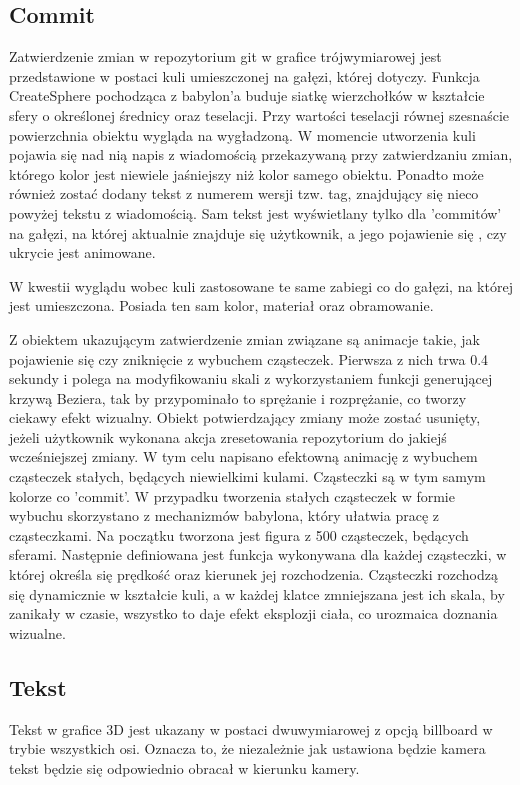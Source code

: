 \documentclass[11pt,a4paper,polish,thesis]{dcsbook}
\begin{document}
	\subsection{Commit}
	Zatwierdzenie zmian w repozytorium git w grafice trójwymiarowej jest przedstawione w postaci kuli umieszczonej na gałęzi, której dotyczy. Funkcja CreateSphere pochodząca z babylon'a buduje siatkę wierzchołków w kształcie sfery o określonej średnicy oraz teselacji. Przy wartości teselacji równej szesnaście powierzchnia obiektu wygląda na wygładzoną. W momencie utworzenia kuli  pojawia się nad nią napis z wiadomością przekazywaną przy zatwierdzaniu zmian, którego kolor jest niewiele jaśniejszy niż kolor samego obiektu. Ponadto może również zostać dodany tekst z numerem wersji tzw. tag, znajdujący się nieco powyżej tekstu z wiadomością. Sam tekst jest wyświetlany tylko dla 'commitów' na gałęzi, na której aktualnie znajduje się użytkownik, a jego pojawienie się , czy ukrycie jest animowane. 

 W kwestii wyglądu wobec kuli zastosowane te same zabiegi co do gałęzi, na której jest umieszczona. Posiada ten sam kolor, materiał oraz obramowanie. 
 
Z obiektem ukazującym zatwierdzenie zmian związane są animacje takie, jak pojawienie się czy zniknięcie z wybuchem cząsteczek. Pierwsza z nich trwa 0.4 sekundy i polega na modyfikowaniu skali z wykorzystaniem funkcji generującej krzywą Beziera, tak by przypominało to sprężanie i rozprężanie, co tworzy ciekawy efekt wizualny. Obiekt potwierdzający zmiany może zostać usunięty, jeżeli użytkownik wykonana akcja zresetowania repozytorium do jakiejś wcześniejszej zmiany. W tym celu napisano efektowną animację z wybuchem cząsteczek stałych, będących niewielkimi kulami. Cząsteczki są w tym samym kolorze co 'commit'. W przypadku tworzenia stałych cząsteczek w formie wybuchu skorzystano z mechanizmów babylona, który ułatwia pracę z cząsteczkami. Na początku tworzona jest figura z 500 cząsteczek, będących sferami. Następnie definiowana jest funkcja wykonywana dla każdej cząsteczki, w której określa się prędkość oraz kierunek jej rozchodzenia. Cząsteczki rozchodzą się dynamicznie w kształcie kuli, a w każdej klatce zmniejszana jest ich skala, by zanikały w czasie, wszystko to daje efekt eksplozji ciała, co urozmaica doznania wizualne. 
 
\subsection{Tekst}
	Tekst w grafice 3D jest ukazany w postaci dwuwymiarowej z opcją billboard w trybie  wszystkich osi. Oznacza to, że niezależnie jak ustawiona będzie kamera tekst będzie się odpowiednio obracał w kierunku kamery. 
\end{document}
